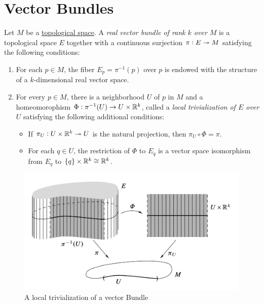\section{Vector Bundles}

\begin{definition}
    Let $M$ be a \underline{topological space}. A \emph{real vector bundle of rank $k$ over $M$} is a topological space $E$ together with a continuous surjection $\pi: E\twoheadrightarrow M$ satisfying the following conditions: 
    \begin{enumerate}[label=(\alph*)]
        \item For each $p\in M$, the fiber $E_p = \pi^{-1}(p)$ over $p$ is endowed with the structure of a $k$-dimensional real vector space.
        \item For every $p\in M$, there is a neighborhood $U$ of $p$ in $M$ and a homeomorophism $\Phi:\pi^{-1}(U)\to U\times\mathbb{R}^k$, called a \emph{local trivialization of $E$ over $U$} satisfying the following additional conditions: 
        \begin{itemize}
            \item If $\pi_U: U\times\mathbb{R}^k\twoheadrightarrow U$ is the natural projection, then $\pi_U\circ\Phi = \pi$.
            \item For each $q\in U$, the restriction of $\Phi$ to $E_q$ is a vector space isomorphism from $E_q$ to $\{q\}\times\mathbb{R}^k\cong\mathbb{R}^k$.
        \end{itemize}
    \end{enumerate}
\end{definition}

\begin{figure}[H]\label{fig:vector-bundle-illustration}
    \includegraphics[width=\textwidth, height=0.3\textheight]{images/vector-bundle-illustration.png}
    \caption{A local trivialization of a vector Bundle}
\end{figure}

